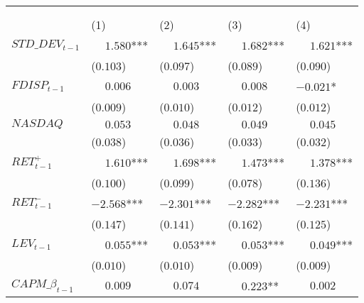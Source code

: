 \begin{table}
\begin{tabular}[t]{>{\raggedright\arraybackslash}p{3.1cm}>{\raggedright\arraybackslash}p{2.6cm}>{\raggedright\arraybackslash}p{2.6cm}>{\raggedright\arraybackslash}p{2.6cm}>{\raggedright\arraybackslash}p{2.6cm}}
\multicolumn{1}{c}{ } & \multicolumn{4}{c}{$L\_TURN_t$} \\
\cmidrule(l{3pt}r{3pt}){2-5}
\multicolumn{1}{c}{\bgroup\fontsize{9}{11}\selectfont \em{ }\egroup{}} & \multicolumn{1}{c}{\bgroup\fontsize{9}{11}\selectfont \em{$s \in \{1,2,3\}$}\egroup{}} & \multicolumn{1}{c}{\bgroup\fontsize{9}{11}\selectfont \em{$s \in \{4,5,6\}$}\egroup{}} & \multicolumn{1}{c}{\bgroup\fontsize{9}{11}\selectfont \em{$s \in \{7,8,9\}$}\egroup{}} & \multicolumn{1}{c}{\bgroup\fontsize{9}{11}\selectfont \em{$s \geq 10$}\egroup{}} \\
\cmidrule(l{3pt}r{3pt}){2-2} \cmidrule(l{3pt}r{3pt}){3-3} \cmidrule(l{3pt}r{3pt}){4-4} \cmidrule(l{3pt}r{3pt}){5-5}
 & \phantom{-}(1) & \phantom{-}(2) & \phantom{-}(3) & \phantom{-}(4)\\
\midrule
$STD\_DEV_{t-1}$ & $\phantom{-}1.580$*** & $\phantom{-}1.645$*** & $\phantom{-}1.682$*** & $\phantom{-}1.621$***\\
 & (\phantom{-}$0.103$) & (\phantom{-}$0.097$) & (\phantom{-}$0.089$) & (\phantom{-}$0.090$)\\
\addlinespace
$FDISP_{t-1}$ & $\phantom{-}0.006$ & $\phantom{-}0.003$ & $\phantom{-}0.008$ & $-0.021$*\\
 & (\phantom{-}$0.009$) & (\phantom{-}$0.010$) & (\phantom{-}$0.012$) & (\phantom{-}$0.012$)\\
\addlinespace
$NASDAQ$ & $\phantom{-}0.053$ & $\phantom{-}0.048$ & $\phantom{-}0.049$ & $\phantom{-}0.045$\\
 & (\phantom{-}$0.038$) & (\phantom{-}$0.036$) & (\phantom{-}$0.033$) & (\phantom{-}$0.032$)\\
\addlinespace
$RET^+_{t-1}$ & $\phantom{-}1.610$*** & $\phantom{-}1.698$*** & $\phantom{-}1.473$*** & $\phantom{-}1.378$***\\
 & (\phantom{-}$0.100$) & (\phantom{-}$0.099$) & (\phantom{-}$0.078$) & (\phantom{-}$0.136$)\\
\addlinespace
$RET^-_{t-1}$ & $-2.568$*** & $-2.301$*** & $-2.282$*** & $-2.231$***\\
 & (\phantom{-}$0.147$) & (\phantom{-}$0.141$) & (\phantom{-}$0.162$) & (\phantom{-}$0.125$)\\
\addlinespace
$LEV_{t-1}$ & $\phantom{-}0.055$*** & $\phantom{-}0.053$*** & $\phantom{-}0.053$*** & $\phantom{-}0.049$***\\
 & (\phantom{-}$0.010$) & (\phantom{-}$0.010$) & (\phantom{-}$0.009$) & (\phantom{-}$0.009$)\\
\addlinespace
$CAPM\_\beta_{t-1}$ & $\phantom{-}0.009$ & $\phantom{-}0.074$ & $\phantom{-}0.223$** & $\phantom{-}0.002$\\

\end{tabular}
\end{table}
